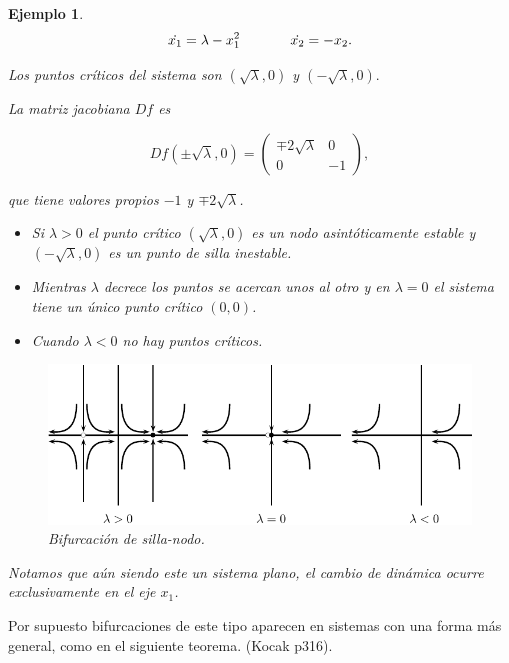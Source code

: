 \documentclass[11pt]{book}
\theoremstyle{definition}
\numberwithin{definition}{section}
\theoremstyle{theorem}
\numberwithin{theorem}{section}
\numberwithin{lemma}{section}
\numberwithin{corollary}{section}
\theoremstyle{plain}
\newtheorem{example}{Ejemplo}
\numberwithin{example}{section}
\begin{document}
\begin{example}
$$ 
	\dot{x_1} = \lambda - x_1^2 \hspace{0.5in} \dot{x_2} = -x_2.
$$

Los puntos críticos del sistema son $(\sqrt{\lambda}, 0)$ y $(-\sqrt{\lambda}, 0).$

La matriz jacobiana $Df$ es

$$
Df(\pm \sqrt{\lambda}, 0) = \left( \begin{array}{ll}
	\mp 2 \sqrt{\lambda} & 0 \\
	0 & -1
\end{array} \right),
$$

que tiene valores propios $-1$ y $\mp 2\sqrt{\lambda}$.

\begin{itemize}
	\item Si $\lambda > 0$ el punto crítico $(\sqrt{\lambda}, 0)$ es un nodo asintóticamente estable y $(-\sqrt{\lambda}, 0)$ es un punto de silla inestable.
	\item Mientras $\lambda$ decrece los puntos se acercan unos al otro y en $\lambda = 0$ el sistema tiene un único punto crítico $(0,0)$.
	\item Cuando $\lambda < 0$ no hay puntos críticos.
\end{itemize}

\begin{figure}[ht] \centering
    \includegraphics[scale=1.0]{figures/bifurcations-saddlenode.pdf}
    \caption{Bifurcación de silla-nodo.}
\end{figure}

Notamos que aún siendo este un sistema plano, el cambio de dinámica ocurre exclusivamente en el eje $x_1$.
\end{example}

Por supuesto bifurcaciones de este tipo aparecen en sistemas con una forma más general, como en el siguiente teorema. (Kocak p316).
\end{document}
